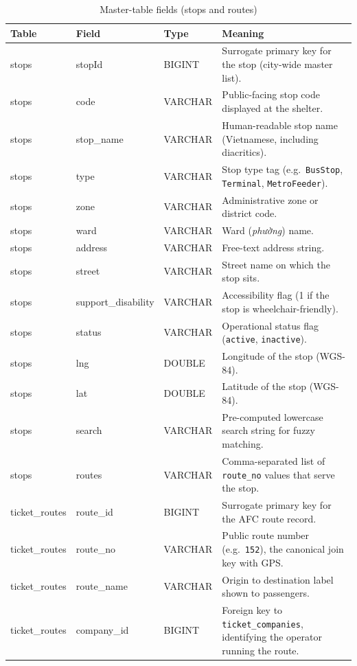 \begin{table}[!htbp]
\centering
\caption{Master-table fields (stops and routes)}
\label{tab:fields:masters}
\footnotesize
\begin{tabularx}{\linewidth}{p{2.4cm} p{2.6cm} p{1.7cm} X}
\hline
\textbf{Table} & \textbf{Field} & \textbf{Type} & \textbf{Meaning} \\
\hline
stops & stopId & BIGINT & Surrogate primary key for the stop (city-wide master list). \\
stops & code & VARCHAR & Public-facing stop code displayed at the shelter. \\
stops & stop\_name & VARCHAR & Human-readable stop name (Vietnamese, including diacritics). \\
stops & type & VARCHAR & Stop type tag (e.g.\ \texttt{BusStop}, \texttt{Terminal}, \texttt{MetroFeeder}). \\
stops & zone & VARCHAR & Administrative zone or district code. \\
stops & ward & VARCHAR & Ward (\textit{phường}) name. \\
stops & address & VARCHAR & Free-text address string. \\
stops & street & VARCHAR & Street name on which the stop sits. \\
stops & support\_disability & VARCHAR & Accessibility flag (1 if the stop is wheelchair-friendly). \\
stops & status & VARCHAR & Operational status flag (\texttt{active}, \texttt{inactive}). \\
stops & lng & DOUBLE & Longitude of the stop (WGS-84). \\
stops & lat & DOUBLE & Latitude of the stop (WGS-84). \\
stops & search & VARCHAR & Pre-computed lowercase search string for fuzzy matching. \\
stops & routes & VARCHAR & Comma-separated list of \texttt{route\_no} values that serve the stop. \\
ticket\_routes & route\_id & BIGINT & Surrogate primary key for the AFC route record. \\
ticket\_routes & route\_no & VARCHAR & Public route number (e.g.\ \texttt{152}), the canonical join key with GPS. \\
ticket\_routes & route\_name & VARCHAR & Origin to destination label shown to passengers. \\
ticket\_routes & company\_id & BIGINT & Foreign key to \texttt{ticket\_companies}, identifying the operator running the route. \\
\hline
\end{tabularx}
\end{table}

